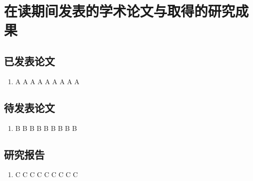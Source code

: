 ﻿\chapter{在读期间发表的学术论文与取得的研究成果}

\section*{已发表论文}

\begin{enumerate}
\renewcommand\labelenumi{[\arabic{enumi}]}
\item A A A A A A A A A
\end{enumerate}

\section*{待发表论文}

\begin{enumerate}
\renewcommand\labelenumi{[\arabic{enumi}]}
\setcounter{enumi}{1}
\item B B B B B B B B B
\end{enumerate}

\section*{研究报告}

\begin{enumerate}
\renewcommand\labelenumi{[\arabic{enumi}]}
\setcounter{enumi}{2}
\item C C C C C C C C C
\end{enumerate}
